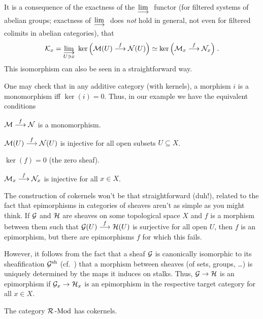 \documentclass[a4paper,parskip=half,numbers=enddot, DIV=12]{scrreprt}
\begin{document}
\begin{rem}
	\begin{alphanumerate}
		\item {}It is a consequence of the exactness of the $\colimit$ functor (for filtered systems of abelian groups; exactness of $\colimit$ does \emph{not} hold in general, not even for filtered colimits in abelian categories), that 
		\begin{align*}
		\Kk_x=\colimit[U\ni x]\ker\Big(\Mm(U)\morphism[f]\Nn(U)\Big)\simeq\ker\Big(\Mm_x\morphism[f]\Nn_x\Big)\;.
		\end{align*}
		This isomorphism can also be seen in a straightforward way.
		
		\item One may check that in any additive category (with kernels), a morphism $i$ is a monomorphism iff $\ker(i)=0$. Thus, in our example we have the equivalent conditions
		\begin{alphanumerate}
			\item[\itememph{\alpha}] $\Mm\morphism[f]\Nn$ is a monomorphism.
			\item[\itememph{\beta}] $\Mm(U)\morphism[f]\Nn(U)$ is injective for all open subsets $U\subseteq X$.
			\item[\itememph{\gamma}] $\ker(f)=0$ (the zero sheaf).
			\item[\itememph{\delta}] $\Mm_x\morphism[f]\Nn_x$ is injective for all $x\in X$.
		\end{alphanumerate}
	\end{alphanumerate}
	The construction of cokernels won't be that straightforward (duh!), related to the fact that epimorphisms in categories of sheaves aren't as simple as you might think. If $\mathcal{G}$ and $\mathcal{H}$ are sheaves on some topological space $X$ and $f$ is a morphism between them such that $\Gg(U)\morphism[f]\Hh(U)$ is surjective for all open $U$, then $f$ is an epimorphism, but there are epimorphisms $f$ for which this fails. 
	
	However, it follows from the fact that a sheaf $\mathcal{G}$ is canonically isomorphic to its sheafification $\mathcal{G}^{\mathrm{sh}}$ (cf.\ \cite[Proposition~1.2.1]{alggeo1}) that a morphism between sheaves (of sets, groups, \ldots) is uniquely determined by the maps it induces on stalks. Thus, $\Gg\morphism\Hh$ is an epimorphism if $\Gg_x\morphism\Hh_x$ is an epimorphism in the respective target category for all $x\in X$.
\end{rem}
\begin{lem}
	The category $\mathcal{R}\operatorname{-Mod}$ has cokernels.
\end{lem}
\end{document}
